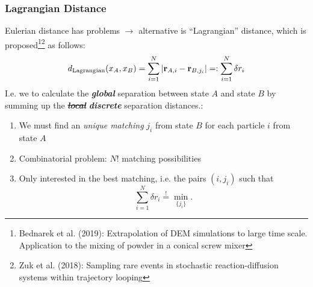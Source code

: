 \documentclass[9pt, english]{beamer}
\begin{document}
\begin{frame}
\frametitle{Lagrangian Distance}
Eulerian distance has problems \(\rightarrow\) alternative is ``Lagrangian'' distance,
which is proposed\footnote{Bednarek et al. (2019): Extrapolation of DEM simulations to large time scale. Application to the mixing of powder in a conical screw mixer}\footnote{Zuk et al. (2018): Sampling rare events in stochastic reaction-diffusion systems within trajectory looping} as follows:
\begin{equation}
 d_{\text{Lagrangian}}(x_A,x_B) = \sum_{i=1}^N{\lvert \vb{r}_{A,i} - \vb{r}_{B,j_i} \rvert} =: \sum_{i=1}^N{\delta r_i}
\end{equation}
I.e. we to calculate the \textit{\textbf{global}} separation between state \(A\) and state \(B\) by summing up the \sout{\textit{\textbf{local}}} \textit{\textbf{discrete}} separation distances.:
\begin{enumerate}
 \item We must find an \textit{unique matching} \(j_i\) from state \(B\) for each particle \(i\) from state \(A\)
 \item Combinatorial problem: \(N!\) matching possibilities
 \item Only interested in the best matching, i.e. the pairs \((i,j_i)\) such that
 \begin{equation}
  \sum_{i=1}^N{\delta r_i} \stackrel{\text{!}}{=} \min_{\{j_i\}}{}.
 \end{equation}
\end{enumerate}
\vspace{+0.3cm}
\end{frame}
\end{document}
